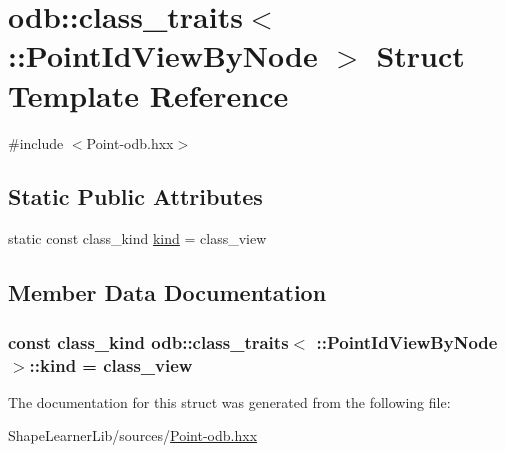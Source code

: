 \hypertarget{structodb_1_1class__traits_3_01_1_1_point_id_view_by_node_01_4}{}\section{odb\+:\+:class\+\_\+traits$<$ \+:\+:Point\+Id\+View\+By\+Node $>$ Struct Template Reference}
\label{structodb_1_1class__traits_3_01_1_1_point_id_view_by_node_01_4}


{\ttfamily \#include $<$Point-\/odb.\+hxx$>$}

\subsection*{Static Public Attributes}
\begin{DoxyCompactItemize}
\item 
static const class\+\_\+kind \hyperlink{structodb_1_1class__traits_3_01_1_1_point_id_view_by_node_01_4_ae674fd95b761ce422967e4488b0b8d74}{kind} = class\+\_\+view
\end{DoxyCompactItemize}


\subsection{Member Data Documentation}
\hypertarget{structodb_1_1class__traits_3_01_1_1_point_id_view_by_node_01_4_ae674fd95b761ce422967e4488b0b8d74}{}
\subsubsection[{kind}]{\setlength{\rightskip}{0pt plus 5cm}const class\+\_\+kind odb\+::class\+\_\+traits$<$ \+::{\bf Point\+Id\+View\+By\+Node} $>$\+::kind = class\+\_\+view\hspace{0.3cm}{\ttfamily [static]}}\label{structodb_1_1class__traits_3_01_1_1_point_id_view_by_node_01_4_ae674fd95b761ce422967e4488b0b8d74}


The documentation for this struct was generated from the following file\+:\begin{DoxyCompactItemize}
\item 
Shape\+Learner\+Lib/sources/\hyperlink{_point-odb_8hxx}{Point-\/odb.\+hxx}\end{DoxyCompactItemize}

